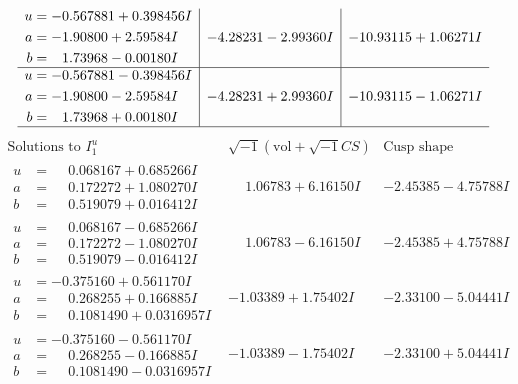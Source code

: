\documentclass[1p]{elsarticle_modified}
\theoremstyle{definition}
\newcommand{\I}{\sqrt{-1}}
\begin{document}
$$\begin{array}{c|c|c}
\begin{aligned}
u &= -0.567881 + 0.398456 I \\
a &= -1.90800 + 2.59584 I \\
b &= \phantom{-}1.73968 - 0.00180 I\end{aligned}
 & -4.28231 - 2.99360 I & -10.93115 + 1.06271 I \\ \hline\begin{aligned}
u &= -0.567881 - 0.398456 I \\
a &= -1.90800 - 2.59584 I \\
b &= \phantom{-}1.73968 + 0.00180 I\end{aligned}
 & -4.28231 + 2.99360 I & -10.93115 - 1.06271 I\\
 \hline 
 \end{array}$$\newpage$$\begin{array}{c|c|c}  
\text{Solutions to }I^u_{1}& \I (\text{vol} + \sqrt{-1}CS) & \text{Cusp shape}\\
 \hline 
\begin{aligned}
u &= \phantom{-}0.068167 + 0.685266 I \\
a &= \phantom{-}0.172272 + 1.080270 I \\
b &= \phantom{-}0.519079 + 0.016412 I\end{aligned}
 & \phantom{-}1.06783 + 6.16150 I & -2.45385 - 4.75788 I \\ \hline\begin{aligned}
u &= \phantom{-}0.068167 - 0.685266 I \\
a &= \phantom{-}0.172272 - 1.080270 I \\
b &= \phantom{-}0.519079 - 0.016412 I\end{aligned}
 & \phantom{-}1.06783 - 6.16150 I & -2.45385 + 4.75788 I \\ \hline\begin{aligned}
u &= -0.375160 + 0.561170 I \\
a &= \phantom{-}0.268255 + 0.166885 I \\
b &= \phantom{-}0.1081490 + 0.0316957 I\end{aligned}
 & -1.03389 + 1.75402 I & -2.33100 - 5.04441 I \\ \hline\begin{aligned}
u &= -0.375160 - 0.561170 I \\
a &= \phantom{-}0.268255 - 0.166885 I \\
b &= \phantom{-}0.1081490 - 0.0316957 I\end{aligned}
 & -1.03389 - 1.75402 I & -2.33100 + 5.04441 I \\ \hline\begin{aligned}

\end{aligned}
\end{array}$$
\end{document}
